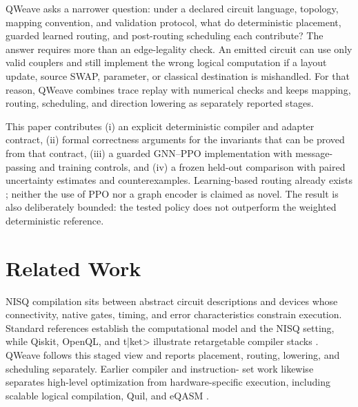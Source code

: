 \documentclass[conference]{IEEEtran}
\begin{document}
QWeave asks a narrower question: under a declared circuit language, topology,
mapping convention, and validation protocol, what do deterministic placement,
guarded learned routing, and post-routing scheduling each contribute? The
answer requires more than an edge-legality check. An emitted circuit can use
only valid couplers and still implement the wrong logical computation if a
layout update, source SWAP, parameter, or classical destination is mishandled.
For that reason, QWeave combines trace replay with numerical checks and keeps
mapping, routing, scheduling, and direction lowering as separately reported
stages.

This paper contributes (i) an explicit deterministic compiler and adapter
contract, (ii) formal correctness arguments for the invariants that can be
proved from that contract, (iii) a guarded GNN--PPO implementation with
message-passing and training controls, and (iv) a frozen held-out comparison
with paired uncertainty estimates and counterexamples. Learning-based routing
already exists \cite{pozzi2020rl,sinha2022gnn}; neither the use of PPO nor a
graph encoder is claimed as novel. The result is also deliberately bounded:
the tested policy does not outperform the weighted deterministic reference.

\section{Related Work}
NISQ compilation sits between abstract circuit descriptions and devices whose
connectivity, native gates, timing, and error characteristics constrain
execution. Standard references establish the computational model and the NISQ
setting, while Qiskit, OpenQL, and t|ket> illustrate retargetable compiler
stacks \cite{preskill2018nisq,bharti2022nisq,nielsenchuang2010,
javadiabhari2024qiskit,khammassi2021openql,sivarajah2020tket,
bandic2022fullstack}. QWeave follows this staged view and reports placement,
routing, lowering, and scheduling separately. Earlier compiler and instruction-
set work likewise separates high-level optimization from hardware-specific
execution, including scalable logical compilation, Quil, and eQASM
\cite{haener2018methodology,javadiabhari2015scaffcc,smith2016quil,
fu2019eqasm}.
\end{document}
